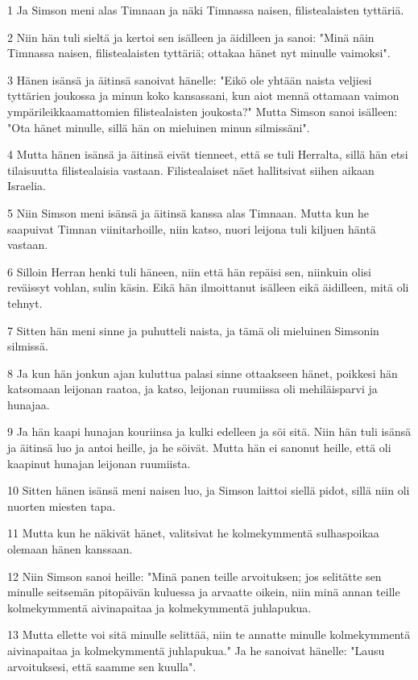 \par 1 Ja Simson meni alas Timnaan ja näki Timnassa naisen, filistealaisten tyttäriä.
\par 2 Niin hän tuli sieltä ja kertoi sen isälleen ja äidilleen ja sanoi: "Minä näin Timnassa naisen, filistealaisten tyttäriä; ottakaa hänet nyt minulle vaimoksi".
\par 3 Hänen isänsä ja äitinsä sanoivat hänelle: "Eikö ole yhtään naista veljiesi tyttärien joukossa ja minun koko kansassani, kun aiot mennä ottamaan vaimon ympärileikkaamattomien filistealaisten joukosta?" Mutta Simson sanoi isälleen: "Ota hänet minulle, sillä hän on mieluinen minun silmissäni".
\par 4 Mutta hänen isänsä ja äitinsä eivät tienneet, että se tuli Herralta, sillä hän etsi tilaisuutta filistealaisia vastaan. Filistealaiset näet hallitsivat siihen aikaan Israelia.
\par 5 Niin Simson meni isänsä ja äitinsä kanssa alas Timnaan. Mutta kun he saapuivat Timnan viinitarhoille, niin katso, nuori leijona tuli kiljuen häntä vastaan.
\par 6 Silloin Herran henki tuli häneen, niin että hän repäisi sen, niinkuin olisi reväissyt vohlan, sulin käsin. Eikä hän ilmoittanut isälleen eikä äidilleen, mitä oli tehnyt.
\par 7 Sitten hän meni sinne ja puhutteli naista, ja tämä oli mieluinen Simsonin silmissä.
\par 8 Ja kun hän jonkun ajan kuluttua palasi sinne ottaakseen hänet, poikkesi hän katsomaan leijonan raatoa, ja katso, leijonan ruumiissa oli mehiläisparvi ja hunajaa.
\par 9 Ja hän kaapi hunajan kouriinsa ja kulki edelleen ja söi sitä. Niin hän tuli isänsä ja äitinsä luo ja antoi heille, ja he söivät. Mutta hän ei sanonut heille, että oli kaapinut hunajan leijonan ruumiista.
\par 10 Sitten hänen isänsä meni naisen luo, ja Simson laittoi siellä pidot, sillä niin oli nuorten miesten tapa.
\par 11 Mutta kun he näkivät hänet, valitsivat he kolmekymmentä sulhaspoikaa olemaan hänen kanssaan.
\par 12 Niin Simson sanoi heille: "Minä panen teille arvoituksen; jos selitätte sen minulle seitsemän pitopäivän kuluessa ja arvaatte oikein, niin minä annan teille kolmekymmentä aivinapaitaa ja kolmekymmentä juhlapukua.
\par 13 Mutta ellette voi sitä minulle selittää, niin te annatte minulle kolmekymmentä aivinapaitaa ja kolmekymmentä juhlapukua." Ja he sanoivat hänelle: "Lausu arvoituksesi, että saamme sen kuulla".
